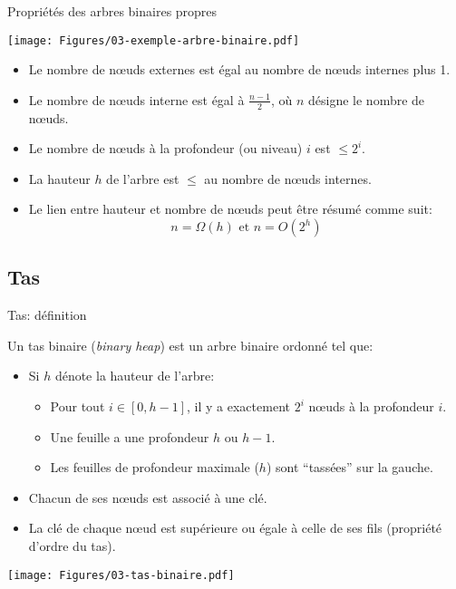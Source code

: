 \begin{frame}{Propriétés des arbres binaires propres}

\centerline{\texttt{[image: Figures/03-exemple-arbre-binaire.pdf]}}

\begin{itemize}
\item Le nombre de n\oe uds externes est égal au nombre de n\oe uds internes plus 1.
\item Le nombre de n\oe uds interne est égal à $\frac{n-1}{2}$, où
  $n$ désigne le nombre de n\oe uds.
\item Le nombre de n\oe uds à la profondeur (ou niveau) $i$ est $\leq 2^i$.
\item La hauteur $h$ de l'arbre est $\leq$ au nombre de n\oe uds internes.
\item Le lien entre hauteur et nombre de n\oe uds peut être résumé comme suit:
$$n=\Omega(h)\mbox{ et }n=O(2^h)$$
\end{itemize}
\end{frame}

\subsection{Tas}

\begin{frame}{Tas: définition}\label{sec:03tas}

Un tas binaire (\emph{binary heap}) est un arbre binaire ordonné tel que:
\begin{itemize}
\item Si $h$ dénote la hauteur de l'arbre:
\begin{itemize}
\item Pour tout $i\in [0,h-1]$, il y a exactement $2^i$ n\oe uds à la profondeur $i$.
\item Une feuille a une profondeur $h$ ou $h-1$.
\item Les feuilles de profondeur maximale ($h$) sont ``tassées'' sur la gauche.
\end{itemize}
\medskip

\item Chacun de ses n\oe uds est associé à une clé.
\item La clé de chaque n\oe ud est supérieure ou égale à celle de ses
  fils (\alert{propriété d'ordre du tas}).
\end{itemize}

\centerline{\texttt{[image: Figures/03-tas-binaire.pdf]}}

\end{frame}

